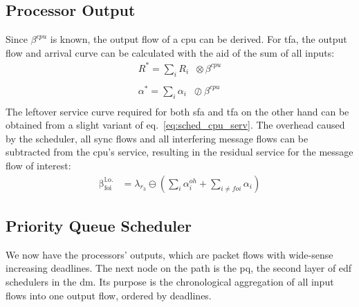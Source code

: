 \subsection{Processor Output}

Since $\beta^{cpu}$ is known, the output flow of a \gls{cpu} can be derived. For \gls{tfa}, the output flow and arrival curve can be calculated with the aid of
the sum of all inputs:
%
\begin{equation}
\begin{aligned}
R^*  = \sum_i R_i \phantom{x}\otimes \beta^{cpu}\\
\\
\alpha^*  = \sum_i \alpha_i \phantom{x}\oslash \beta^{cpu}\\
\label{eq:sched_cpu_tfa}
\end{aligned}
\end{equation}
%
The leftover service curve required for both \gls{sfa} and \gls{tfa} on the other hand can be obtained from a slight variant of eq.~\ref{eq:sched_cpu_serv}.
The overhead caused by the scheduler, all sync flows and all interfering message flows can be subtracted from the \gls{cpu}'s service, resulting in the residual service for the message flow of interest:
%
\begin{equation}
\begin{aligned}
\mathrm{\beta^{l.o.}_{foi}} &= \lambda_{r_3} \ominus \left( \sum_i \alpha^{oh}_i + \sum_{i \neq foi} \alpha_{i} \right)
\label{eq:sched_cpu_sfa}
\end{aligned}
\end{equation}
%

\subsection{Priority Queue Scheduler}

We now have the processors' outputs, which are packet flows with wide-sense increasing deadlines.
The next node on the path is the \gls{pq}, the second layer of \gls{edf} schedulers in the \gls{dm}. Its purpose is the chronological aggregation of all input flows
into one output flow, ordered by deadlines.

